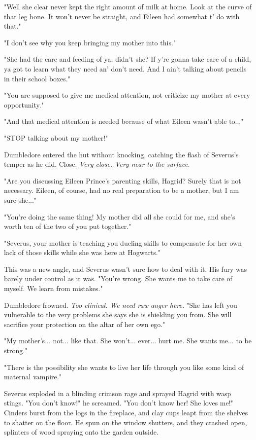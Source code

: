 \documentclass[a4paper,11pt]{article}
\begin{document}
"Well she clear never kept the right amount of milk at home. Look at the curve of that leg bone. It won't never be straight, and Eileen had somewhat t' do with that."

"I don't see why you keep bringing my mother into this."

"She had the care and feeding of ya, didn't she? If y're gonna take care of a child, ya got to learn what they need an' don't need. And I ain't talking about pencils in their school boxes."

"You are supposed to give me medical attention, not criticize my mother at every opportunity."

"And that medical attention is needed because of what Eileen wasn't able to..."

"STOP talking about my mother!"

Dumbledore entered the hut without knocking, catching the flash of Severus's temper as he did. Close. \emph{Very close. Very near to the surface.}

"Are you discussing Eileen Prince's parenting skills, Hagrid? Surely that is not necessary. Eileen, of course, had no real preparation to be a mother, but I am sure she..."

"You're doing the same thing! My mother did all she could for me, and she's worth ten of the two of you put together."

"Severus, your mother is teaching you dueling skills to compensate for her own lack of those skills while she was here at Hogwarts."

This was a new angle, and Severus wasn't sure how to deal with it. His fury was barely under control as it was. "You're wrong. She wants me to take care of myself. We learn from mistakes."

Dumbledore frowned. \emph{Too clinical. We need raw anger here.} "She has left you vulnerable to the very problems she says she is shielding you from. She will sacrifice your protection on the altar of her own ego."

"My mother's... not... like that. She won't... ever... hurt me. She wants me... to be strong."

"There is the possibility she wants to live her life through you like some kind of maternal vampire."

Severus exploded in a blinding crimson rage and sprayed Hagrid with wasp stings. "You don't know!" he screamed. "You don't know her! She loves me!" Cinders burst from the logs in the fireplace, and clay cups leapt from the shelves to shatter on the floor. He spun on the window shutters, and they crashed open, splinters of wood spraying onto the garden outside.
\end{document}

